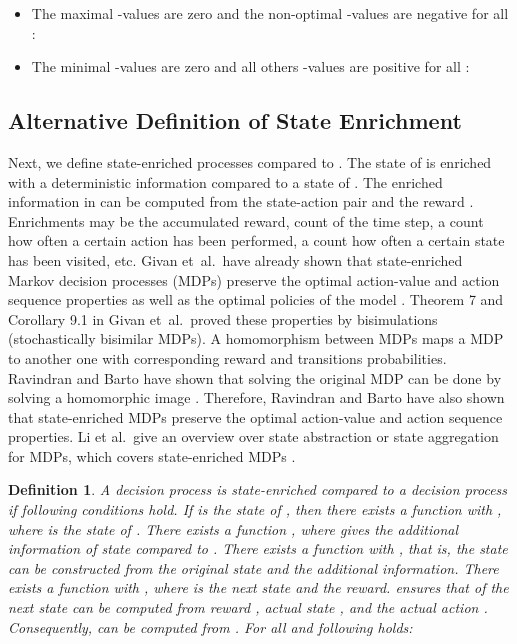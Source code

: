 \documentclass{article}
\newtheorem{definitionA}{Definition}
\begin{document}
\begin{appendices}
\begin{itemize}
\item The maximal -values are zero and the non-optimal -values are negative
for all :

  
\item The minimal -values are zero and all others -values are positive
for all :

\end{itemize}




\subsection{Alternative Definition of State Enrichment}
\label{sec:AStateEnrich}
Next, we define state-enriched processes  compared to .
The state  of  is enriched with a
deterministic information compared to a state  of .
The enriched information
in  can be computed from the state-action pair 
and the reward .
Enrichments may be the accumulated reward, count of the time step,
a count how often a certain action
has been performed, a count how often a certain state has been
visited, etc.
Givan et~al.\ have already shown that state-enriched Markov decision
processes (MDPs) preserve the optimal action-value and action sequence properties
as well as the optimal policies of the model \cite{Givan:03}.
Theorem 7 and Corollary 9.1 in Givan et~al.\ proved
these properties \cite{Givan:03} by bisimulations
(stochastically bisimilar MDPs).
A homomorphism between MDPs maps a MDP 
to another one with corresponding reward and transitions probabilities.
Ravindran and Barto have shown that solving the original MDP can be
done by solving a homomorphic image \cite{Ravindran:03}.
Therefore, Ravindran and Barto have also shown that 
state-enriched MDPs preserve the optimal action-value and action sequence properties.
Li et al.\ give an overview over state abstraction or state aggregation for
MDPs, which covers state-enriched MDPs \cite{Li:06}.


\begin{definitionA}
  A decision process  is {\em state-enriched} compared to
  a decision process  if following conditions hold.
  If  is the state of ,
  then there exists a function  with ,
  where   is the state of .
  There exists a function , where 
  gives the additional information of state  compared to .
  There exists a function  with
  , that is, the state  can be
  constructed from the original state and the additional information.
  There exists a function  with , where 
  is the next state and  the reward.
   ensures that   of the next state 
  can be computed from
  reward , actual state , and the actual action
  . Consequently,  can be computed from .
  For all  and  following holds: 
 

\end{definitionA}
\end{appendices}
\end{document}
